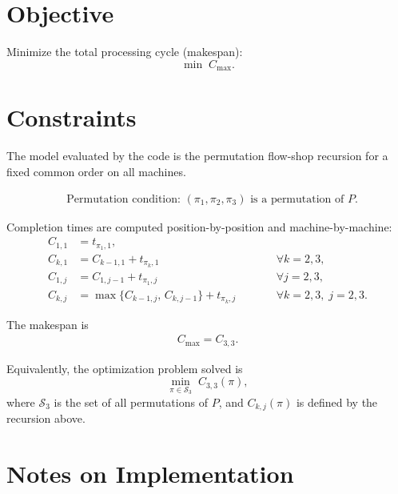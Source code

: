 \section*{Objective}

Minimize the total processing cycle (makespan):
\[
\min \; C_{\max}.
\]

\section*{Constraints}

The model evaluated by the code is the permutation flow-shop recursion for a fixed common order on all machines.

\begin{align}
&\text{Permutation condition: } (\pi_1,\pi_2,\pi_3) \text{ is a permutation of } P. \label{perm}
\end{align}

Completion times are computed position-by-position and machine-by-machine:
\begin{align}
C_{1,1} &= t_{\pi_1,1}, \\
C_{k,1} &= C_{k-1,1} + t_{\pi_k,1} \qquad &&\forall k=2,3, \\
C_{1,j} &= C_{1,j-1} + t_{\pi_1,j} \qquad &&\forall j=2,3, \\
C_{k,j} &= \max\{C_{k-1,j},\, C_{k,j-1}\} + t_{\pi_k,j}
\qquad &&\forall k=2,3,\; j=2,3.
\end{align}

The makespan is
\begin{align}
C_{\max} = C_{3,3}.
\end{align}

Equivalently, the optimization problem solved is
\[
\min_{\pi \in \mathcal{S}_3} \; C_{3,3}(\pi),
\]
where $\mathcal{S}_3$ is the set of all permutations of $P$, and $C_{k,j}(\pi)$ is defined by the recursion above.

\section*{Notes on Implementation}

